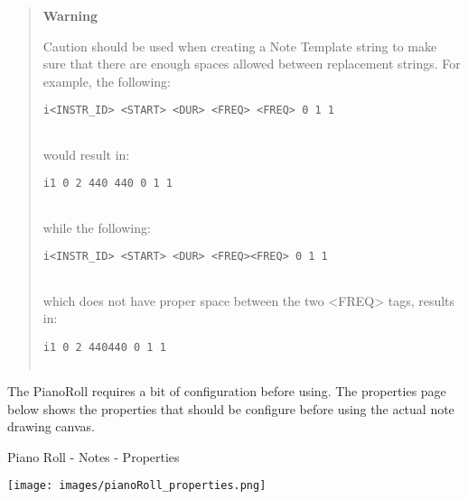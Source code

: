 \begin{quote}
\textbf{Warning}

Caution should be used when creating a Note Template string to make sure
that there are enough spaces allowed between replacement strings. For
example, the following:

\begin{verbatim}
i<INSTR_ID> <START> <DUR> <FREQ> <FREQ> 0 1 1
      
\end{verbatim}

would result in:

\begin{verbatim}
i1 0 2 440 440 0 1 1
      
\end{verbatim}

while the following:

\begin{verbatim}
i<INSTR_ID> <START> <DUR> <FREQ><FREQ> 0 1 1
      
\end{verbatim}

which does not have proper space between the two
\textless{}FREQ\textgreater{} tags, results in:

\begin{verbatim}
i1 0 2 440440 0 1 1
      
\end{verbatim}
\end{quote}

The PianoRoll requires a bit of configuration before using. The
properties page below shows the properties that should be configure
before using the actual note drawing canvas.

Piano Roll - Notes - Properties

\texttt{[image: images/pianoRoll\_properties.png]}


